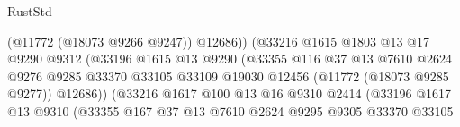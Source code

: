 \begin{lexlean}{RustStd}
\begin{coremodule}
                                              (@11772 (@18073 @9266 @9247))
                                              @12686))
                                          (@33216
                                            @1615
                                            @1803
                                            @13
                                            @17
                                            @9290
                                            @9312
                                            (@33196
                                              @1615
                                              @13
                                              @9290
                                              (@33355
                                                @116
                                                @37
                                                @13
                                                @7610
                                                @2624
                                                @9276
                                                @9285
                                                @33370
                                                @33105
                                                @33109
                                                @19030
                                                @12456
                                                (@11772 (@18073 @9285 @9277))
                                                @12686))
                                            (@33216
                                              @1617
                                              @100
                                              @13
                                              @16
                                              @9310
                                              @2414
                                              (@33196
                                                @1617
                                                @13
                                                @9310
                                                (@33355
                                                  @167
                                                  @37
                                                  @13
                                                  @7610
                                                  @2624
                                                  @9295
                                                  @9305
                                                  @33370
                                                  @33105

\end{coremodule}
\end{lexlean}
